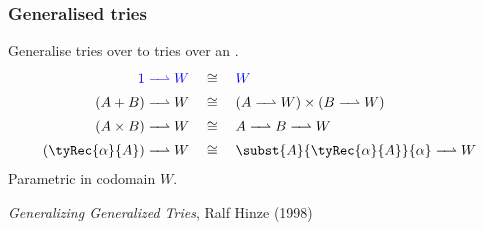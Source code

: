 \begin{frame}
\frametitle{Generalised tries}

Generalise tries over  to tries over an .
\begin{align*}
\textcolor{blue}{1 \toFin W}
&\quad\cong\quad
\textcolor{blue}{W}
\\
(A + B) \toFin W
&\quad\cong\quad
(A \toFin W) \times (B \toFin W)
\\
(A \times B) \toFin W
&\quad\cong\quad
A \toFin B \toFin W
\\
(\tyRec{\alpha}{A}) \toFin W
&\quad\cong\quad
\subst{A}{\tyRec{\alpha}{A}}{\alpha} \toFin W
\end{align*}
Parametric in codomain $W$.

\vspace{10pt}
\emph{Generalizing Generalized Tries}, Ralf Hinze (1998)
\end{frame}
